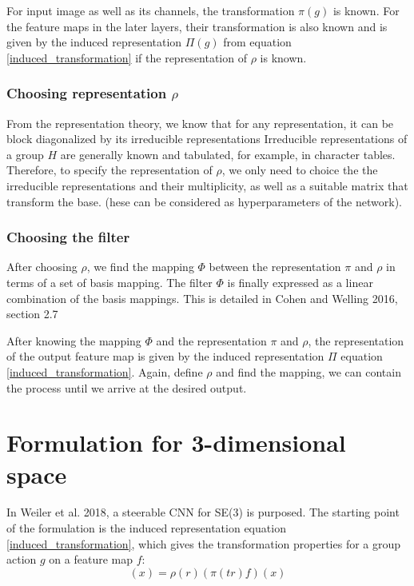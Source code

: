 \documentclass{article}
\begin{document}
For input image as well as its channels, the transformation $\pi(g)$ is known. For the feature maps in the later layers, 
their transformation is also known and is given by the induced representation $\Pi(g)$ from equation \eqref{induced_transformation}
if the representation of $\rho$ is known. 

\subsubsection*{Choosing representation $\rho$}
From the representation theory, we know that for any representation, it can be 
block diagonalized by its irreducible representations
Irreducible representations of a group $H$ are generally known and tabulated, for example, in character tables. 
Therefore, to specify the representation of $\rho$, we 
only need to choice the the irreducible representations and their multiplicity, as well as a suitable matrix that transform the base.
(hese can be considered as hyperparameters of the network).

\subsubsection*{Choosing the filter}
After choosing $\rho$, we find the mapping $\Phi$ between the representation $\pi$ and $\rho$ in terms of a set of 
basis mapping. The filter $\Phi$ is finally expressed as a linear combination of the basis mappings. This is detailed in 
Cohen and Welling 2016, section 2.7

After knowing the mapping $\Phi$ and the representation $\pi$ and $\rho$, the representation of the output feature map is given by 
the induced representation $\Pi$ equation \eqref{induced_transformation}. Again, define $\rho$ and find the mapping, we can 
contain the process until we arrive at the desired output.


\section{Formulation for 3-dimensional space}
In Weiler et al. 2018, a steerable CNN for SE(3) is purposed. 
The starting point of the formulation is the induced representation equation \eqref{induced_transformation}, which gives the transformation 
properties for a group action $g$ on a feature map $f$:
\begin{equation}
    [\Pi(tr) f ](x)= \rho(r) (\pi(tr) f) (x)
\end{equation}
\end{document}
